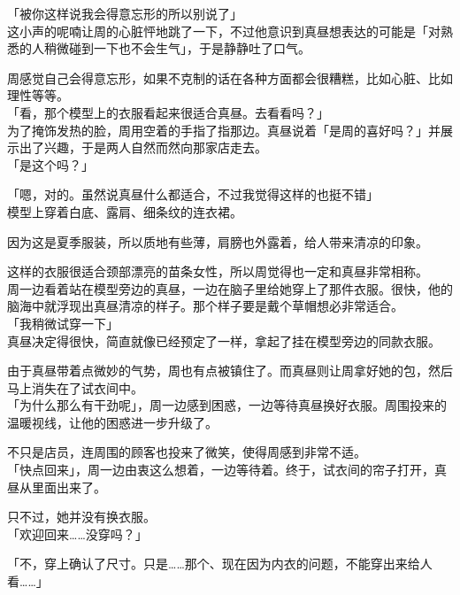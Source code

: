 「被你这样说我会得意忘形的所以别说了」\\

这小声的呢喃让周的心脏怦地跳了一下，不过他意识到真昼想表达的可能是「对熟悉的人稍微碰到一下也不会生气」，于是静静吐了口气。

周感觉自己会得意忘形，如果不克制的话在各种方面都会很糟糕，比如心脏、比如理性等等。\\

「看，那个模型上的衣服看起来很适合真昼。去看看吗？」\\

为了掩饰发热的脸，周用空着的手指了指那边。真昼说着「是周的喜好吗？」并展示出了兴趣，于是两人自然而然向那家店走去。\\

「是这个吗？」

「嗯，对的。虽然说真昼什么都适合，不过我觉得这样的也挺不错」\\

模型上穿着白底、露肩、细条纹的连衣裙。

因为这是夏季服装，所以质地有些薄，肩膀也外露着，给人带来清凉的印象。

这样的衣服很适合颈部漂亮的苗条女性，所以周觉得也一定和真昼非常相称。\\

周一边看着站在模型旁边的真昼，一边在脑子里给她穿上了那件衣服。很快，他的脑海中就浮现出真昼清凉的样子。那个样子要是戴个草帽想必非常适合。\\

「我稍微试穿一下」\\

真昼决定得很快，简直就像已经预定了一样，拿起了挂在模型旁边的同款衣服。

由于真昼带着点微妙的气势，周也有点被镇住了。而真昼则让周拿好她的包，然后马上消失在了试衣间中。\\

「为什么那么有干劲呢」，周一边感到困惑，一边等待真昼换好衣服。周围投来的温暖视线，让他的困惑进一步升级了。

不只是店员，连周围的顾客也投来了微笑，使得周感到非常不适。\\

「快点回来」，周一边由衷这么想着，一边等待着。终于，试衣间的帘子打开，真昼从里面出来了。

只不过，她并没有换衣服。\\

「欢迎回来……没穿吗？」

「不，穿上确认了尺寸。只是……那个、现在因为内衣的问题，不能穿出来给人看……」

